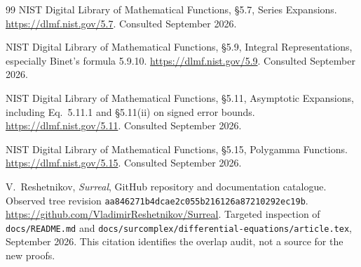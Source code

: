 \documentclass[11pt,letterpaper]{article}
\numberwithin{equation}{section}
\theoremstyle{plain}
\theoremstyle{definition}
\theoremstyle{remark}
\newcommand{\commit}{\nolinkurl{aa846271b4dcae2c055b216126a87210292ec19b}}
\begin{document}
\begin{thebibliography}{99}
NIST Digital Library of Mathematical Functions,
\S5.7, Series Expansions.
\url{https://dlmf.nist.gov/5.7}.
Consulted September 2026.

NIST Digital Library of Mathematical Functions,
\S5.9, Integral Representations, especially Binet's formula 5.9.10.
\url{https://dlmf.nist.gov/5.9}.
Consulted September 2026.

NIST Digital Library of Mathematical Functions,
\S5.11, Asymptotic Expansions, including Eq.~5.11.1 and \S5.11(ii)
on signed error bounds.
\url{https://dlmf.nist.gov/5.11}.
Consulted September 2026.

NIST Digital Library of Mathematical Functions,
\S5.15, Polygamma Functions.
\url{https://dlmf.nist.gov/5.15}.
Consulted September 2026.

V.~Reshetnikov,
\emph{Surreal}, GitHub repository and documentation catalogue.
Observed tree revision \commit.
\url{https://github.com/VladimirReshetnikov/Surreal}.
Targeted inspection of \texttt{docs/README.md} and
\texttt{docs/surcomplex/differential-equations/article.tex}, September 2026.
This citation identifies the overlap audit, not a source for the new proofs.

\end{thebibliography}
\end{document}

